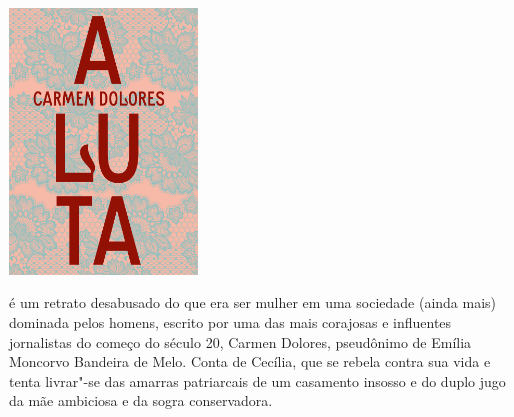 \pagebreak

\hspace{.5cm}

\begin{center}
\hspace*{-4cm}
\hspace*{4cm}\includegraphics[width=50mm]{./imgs/luta.jpg}
\end{center}

\hspace*{-7cm}\hrulefill\hspace*{-7cm}

\medskip

 é um retrato desabusado do que era ser mulher em uma sociedade (ainda mais) dominada pelos homens, escrito por uma das mais corajosas e influentes jornalistas do começo do século 20, Carmen Dolores, pseudônimo de Emília Moncorvo Bandeira de Melo. Conta de Cecília, que se rebela contra sua vida e tenta livrar"-se das amarras patriarcais de um casamento insosso e do duplo jugo da mãe ambiciosa e da sogra conservadora.

\vfill

\hspace*{-.4cm}\begin{minipage}[c]{1\linewidth}
\small{
{}}
\end{minipage}

